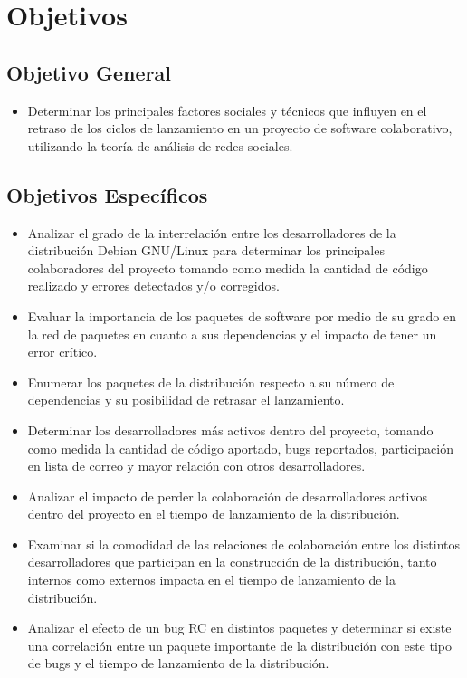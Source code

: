 \documentclass[letterpaper,12pt,titlepage]{report}
\begin{document}
\chapter{Objetivos}
\section*{Objetivo General}
\begin{itemize}
\item Determinar los principales factores sociales y técnicos que
  influyen en el retraso de los ciclos de lanzamiento en un proyecto
  de software colaborativo, utilizando la teoría de análisis de redes
  sociales.
\end{itemize}

\section*{Objetivos Específicos}
\begin{itemize}
\item Analizar el grado de la interrelación entre los desarrolladores
  de la distribución Debian GNU/Linux para determinar los principales
  colaboradores del proyecto tomando como medida la cantidad de código
  realizado y errores detectados y/o corregidos.
\item Evaluar la importancia de los paquetes de software por medio de
  su grado en la red de paquetes en cuanto a sus dependencias y el
  impacto de tener un error crítico.
\item Enumerar los paquetes de la distribución respecto a su número de
  dependencias y su posibilidad de retrasar el lanzamiento.
\item Determinar los desarrolladores más activos dentro del proyecto,
  tomando como medida la cantidad de código aportado, bugs reportados,
  participación en lista de correo y mayor relación con otros
  desarrolladores.
\item Analizar el impacto de perder la colaboración de desarrolladores
  activos dentro del proyecto en el tiempo de lanzamiento de la
  distribución.
\item Examinar si la comodidad de las relaciones de colaboración entre
  los distintos desarrolladores que participan en la construcción de
  la distribución, tanto internos como externos impacta en el tiempo
  de lanzamiento de la distribución.
\item Analizar el efecto de un bug RC en distintos paquetes y
  determinar si existe una correlación entre un paquete importante de
  la distribución con este tipo de bugs y el tiempo de lanzamiento de
  la distribución.
\end{itemize}
\end{document}
